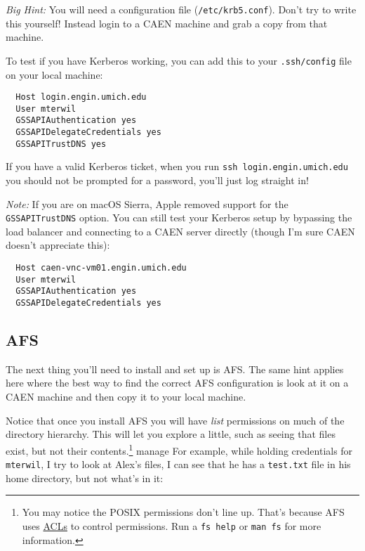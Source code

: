 \documentclass{article}
\begin{document}
\emph{Big Hint:} You will need a configuration file (\texttt{/etc/krb5.conf}).
Don't try to write this yourself! Instead login to a CAEN machine and grab a
copy from that machine.

To test if you have Kerberos working, you can add this to your
\texttt{.ssh/config} file on your local machine:

\begin{lstlisting}
  Host login.engin.umich.edu
  User mterwil
  GSSAPIAuthentication yes
  GSSAPIDelegateCredentials yes
  GSSAPITrustDNS yes
\end{lstlisting}

If you have a valid Kerberos ticket, when you run
\texttt{ssh~login.engin.umich.edu} you should not be prompted for a password,
you'll just log straight in!

\emph{Note:} If you are on macOS Sierra, Apple removed support for the
\texttt{GSSAPITrustDNS} option. You can still test your Kerberos setup by
bypassing the load balancer and connecting to a CAEN server directly (though I'm
sure CAEN doesn't appreciate this):

\begin{lstlisting}
  Host caen-vnc-vm01.engin.umich.edu
  User mterwil
  GSSAPIAuthentication yes
  GSSAPIDelegateCredentials yes
\end{lstlisting}

\subsection*{AFS}

The next thing you'll need to install and set up is AFS. The same hint applies
here where the best way to find the correct AFS configuration is look at it on
a CAEN machine and then copy it to your local machine.

Notice that once you install AFS you will have \emph{list} permissions on much
of the directory hierarchy. This will let you explore a little, such as seeing
that files exist, but not their contents.\footnote{You may notice the POSIX
permissions don't line up. That's because AFS uses
\href{https://web.njit.edu/info/afs.perms.html}{ACLs} to control permissions.
Run a \texttt{fs help} or \texttt{man fs} for more information. }
manage  For example, while holding credentials for \texttt{mterwil}, I try to
look at Alex's files, I can see that he has a \texttt{test.txt} file in his home
directory, but not what's in it:
\end{document}
